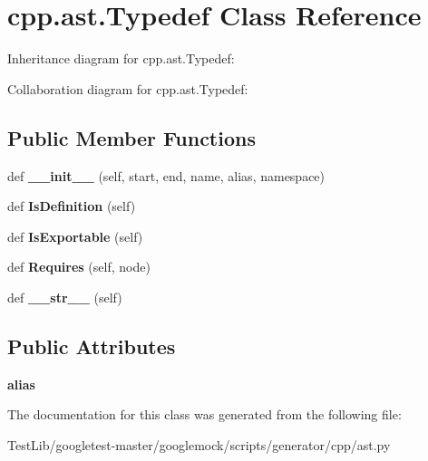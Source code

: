 \hypertarget{classcpp_1_1ast_1_1Typedef}{}\section{cpp.\+ast.\+Typedef Class Reference}
\label{classcpp_1_1ast_1_1Typedef}


Inheritance diagram for cpp.\+ast.\+Typedef\+:


Collaboration diagram for cpp.\+ast.\+Typedef\+:
\subsection*{Public Member Functions}
\begin{DoxyCompactItemize}
\item 
\mbox{\label{classcpp_1_1ast_1_1Typedef_af3275d2390190a074de470c1424e05e0}} 
def {\bfseries \+\_\+\+\_\+init\+\_\+\+\_\+} (self, start, end, name, alias, namespace)
\item 
\mbox{\label{classcpp_1_1ast_1_1Typedef_a103bf391e665884bfbfd20fc5e6d1a19}} 
def {\bfseries Is\+Definition} (self)
\item 
\mbox{\label{classcpp_1_1ast_1_1Typedef_adee58e4674b049d8e4435b5b6ad8e1d4}} 
def {\bfseries Is\+Exportable} (self)
\item 
\mbox{\label{classcpp_1_1ast_1_1Typedef_aa9f65f4a97ba340f2c9ebc5e7ce27e8c}} 
def {\bfseries Requires} (self, node)
\item 
\mbox{\label{classcpp_1_1ast_1_1Typedef_a451920900affc5f12e38ab8fbf5e3dea}} 
def {\bfseries \+\_\+\+\_\+str\+\_\+\+\_\+} (self)
\end{DoxyCompactItemize}
\subsection*{Public Attributes}
\begin{DoxyCompactItemize}
\item 
\mbox{\label{classcpp_1_1ast_1_1Typedef_a3187a504dfbefe50b866b44902823c30}} 
{\bfseries alias}
\end{DoxyCompactItemize}


The documentation for this class was generated from the following file\+:\begin{DoxyCompactItemize}
\item 
Test\+Lib/googletest-\/master/googlemock/scripts/generator/cpp/ast.\+py\end{DoxyCompactItemize}
